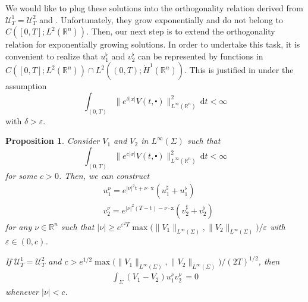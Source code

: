 \documentclass[10pt,a4paper]{amsart}
\newtheorem{proposition}{Proposition}[section]
\theoremstyle{remark}
\theoremstyle{definition}
\newcommand{\R}{\mathbb{R}}
\newcommand{\dd}{\mathrm{d}}
\newcommand{\tm}{\mathrm{t}}
\newcommand{\x}{\mathrm{x}}
\begin{document}
We would like to plug these solutions into the orthogonality relation derived from
$\mathcal{U}_T^1 = \mathcal{U}_T^2$ and . Unfortunately, they grow
exponentially and do not belong to $C([0,T]; L^2(\R^n))$. Then, our next step is to extend the
orthogonality relation for exponentially growing solutions. In order to undertake this task,
it is convenient to realize that $u_1^\flat$ and $v_2^\flat$ can be represented by functions in
$C([0, T]; L^2(\R^n))\cap L^2((0,T); \dot H^1(\R^n))$. This is justified in  under the 
assumption 
\begin{equation*}
\int_{(0,T)} \| e^{\delta |x|} V(t, \centerdot) \|_{L^\infty (\R^n)}^2 \, \dd t < \infty
\end{equation*}
with $\delta > \varepsilon$.


\begin{proposition}\label{prop:extension-ortho}\sl 
Consider $V_1$ and $V_2 $ in $ L^\infty (\Sigma)$
such that
\[\int_{(0,T)} \| e^{c |x|} V(t, \centerdot) \|_{L^\infty (\R^n)}^2 \, \dd t < \infty\]
for some $c>0$.
Then, we can construct 
\begin{align*}
& u_1^\nu = e^{|\nu|^2 \tm + \nu \cdot \x} (u_1^\sharp + u_1^\flat)\\
& v_2^\nu = e^{|\nu|^2 (T - \tm) - \nu \cdot \x} (v_2^\sharp + v_2^\flat)
\end{align*}
for any $\nu \in \R^n $ such that 
$|\nu| \geq e^{\varepsilon^2 T} \max\big(\| V_1 \|_{L^\infty (\Sigma)}, \| V_2 \|_{L^\infty (\Sigma)}\big)/\varepsilon$ with $\varepsilon \in (0, c)$.

If $\mathcal{U}_{T}^{1}=\mathcal{U}_{T}^{2}$ and 
$c > e^{1/2} \max\big(\| V_1 \|_{L^\infty (\Sigma)}, \| V_2 \|_{L^\infty (\Sigma)}\big)/(2T)^{1/2}$, then
\begin{align}\label{17}
   \int_\Sigma (V_1 - V_2) u_1^\nu v_2^\nu \, =0
\end{align}
whenever $|\nu| < c$.
\end{proposition}
\end{document}
